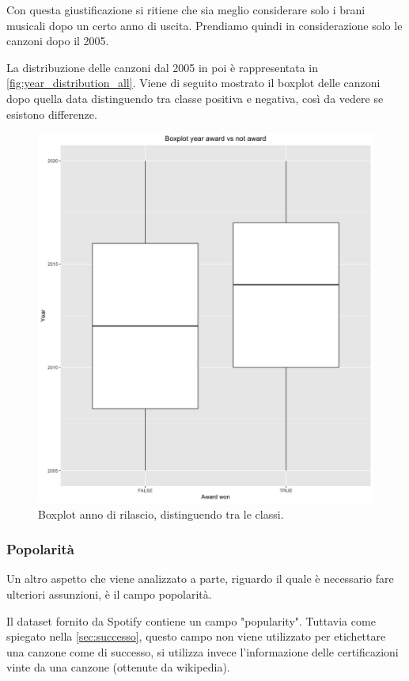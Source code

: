 Con questa giustificazione si ritiene che sia meglio considerare solo
i brani musicali dopo un certo anno di uscita. Prendiamo quindi in
considerazione solo le canzoni dopo il 2005.

La distribuzione delle canzoni dal 2005 in poi è rappresentata in
\autoref{fig:year_distribution_all}. Viene di seguito mostrato il
boxplot delle canzoni dopo quella data distinguendo tra classe
positiva e negativa, così da vedere se esistono differenze.

 \begin{figure}[H]
 	\centering
 	\includegraphics[width=13cm]{../images/year_award_comparison.png}
 	\caption{Boxplot anno di rilascio, distinguendo tra le classi.}
 	\label{fig:year_boxplot_award}
 \end{figure}
 
\subsubsection{Popolarità}
\label{sec:popularity}
Un altro aspetto che viene analizzato a parte, riguardo il quale è
necessario fare ulteriori assunzioni, è il campo popolarità.

Il dataset fornito da Spotify contiene un campo "popularity". Tuttavia
come spiegato nella \autoref{sec:successo}, questo campo non viene
utilizzato per etichettare una canzone come di successo, si utilizza
invece l'informazione delle certificazioni vinte da una canzone
(ottenute da wikipedia).

